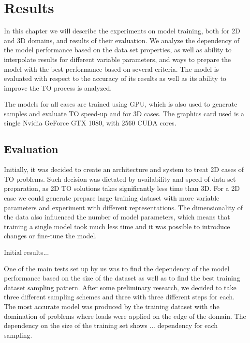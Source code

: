 
\chapter{Results}
\label{chapter:Results}

In this chapter we will describe the experiments on model training, both for 2D and 3D domains, and results of their evaluation.
We analyze the dependency of the model performance based on the data set properties, as well as ability to interpolate results for different variable parameters, and ways to prepare the model with the best performance based on several criteria. 
The model is evaluated with respect to the accuracy of its results as well as  its ability to improve the TO process is analyzed.

The models for all cases are trained using GPU, which is also used to generate samples and evaluate TO speed-up and for 3D cases.
The graphics card used is a single Nvidia GeForce GTX 1080, with 2560 CUDA cores. 


\section{Evaluation}

Initially, it was decided to create an architecture and system to treat 2D cases of TO problems.
Such decision was dictated by availability and speed of data set preparation, as 2D TO solutions takes significantly less time than 3D. 
For a 2D case we could generate prepare large training dataset with more variable parameters and experiment with different representations.
The dimensionality of the data also influenced the number of model parameters, which means that training a single model took much less time and it was possible to introduce changes or fine-tune the model.



Initial results...
\medskip

One of the main tests set up by us was to find the dependency of the model performance based on the size of the dataset as well as to find the best training dataset sampling pattern.
After some preliminary research, we decided to take three different sampling schemes and three with three different steps for each. 
The most accurate model was produced by the training dataset with the domination of problems where loads were applied on the edge of the domain.
The dependency on the size of the training set shows ...  dependency for each sampling.
\medskip

